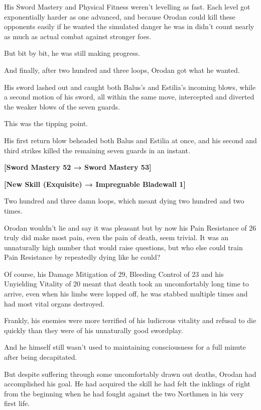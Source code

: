\documentclass[a4paper,10pt]{book}
\begin{document}
His Sword Mastery and Physical Fitness weren’t levelling as fast. Each level got exponentially harder as one advanced, and because Orodan could kill these opponents easily if he wanted the simulated danger he was in didn’t count nearly as much as actual combat against stronger foes.\par
But bit by bit, he was still making progress.\par
And finally, after two hundred and three loops, Orodan got what he wanted.\par
His sword lashed out and caught both Balus’s and Estilia’s incoming blows, while a second motion of his sword, all within the same move, intercepted and diverted the weaker blows of the seven guards.\par
This was the tipping point.\par
His first return blow beheaded both Balus and Estilia at once, and his second and third strikes killed the remaining seven guards in an instant.\par
\textbf{[Sword Mastery 52 → Sword Mastery 53]}\par
\textbf{[New Skill (Exquisite) → Impregnable Bladewall 1]}\par
Two hundred and three damn loops, which meant dying two hundred and two times.\par
Orodan wouldn’t lie and say it was pleasant but by now his Pain Resistance of 26 truly did make most pain, even the pain of death, seem trivial. It was an unnaturally high number that would raise questions, but who else could train Pain Resistance by repeatedly dying like he could?\par
Of course, his Damage Mitigation of 29, Bleeding Control of 23 and his Unyielding Vitality of 20 meant that death took an uncomfortably long time to arrive, even when his limbs were lopped off, he was stabbed multiple times and had most vital organs destroyed.\par
Frankly, his enemies were more terrified of his ludicrous vitality and refusal to die quickly than they were of his unnaturally good swordplay.\par
And he himself still wasn’t used to maintaining consciousness for a full minute after being decapitated.\par
But despite suffering through some uncomfortably drawn out deaths, Orodan had accomplished his goal. He had acquired the skill he had felt the inklings of right from the beginning when he had fought against the two Northmen in his very first life.\par
\end{document}
